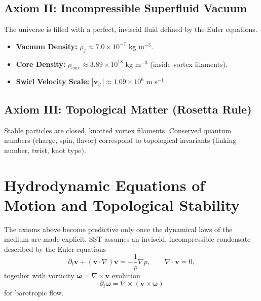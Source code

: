 \documentclass[10pt]{article}
\newcommand{\vswirl}{\mathbf{v}_{\!\boldsymbol{\circlearrowleft}}}
\newcommand{\rhof}{\rho_{\!f}}                           %
\newcommand{\rhocore}{\rho_{\text{core}}}
\begin{document}
        \subsection*{Axiom II: Incompressible Superfluid Vacuum}
            The universe is filled with a perfect, inviscid fluid defined by the Euler equations.
            \begin{itemize}
                \item \textbf{Vacuum Density:} $\rhof \approx 7.0 \times 10^{-7}$ kg m$^{-3}$.
                \item \textbf{Core Density:} $\rhocore \approx 3.89 \times 10^{18}$ kg m$^{-3}$ (inside vortex filaments).
                \item \textbf{Swirl Velocity Scale:} $|\vswirl| \approx 1.09 \times 10^6$ m s$^{-1}$.
            \end{itemize}

        \subsection*{Axiom III: Topological Matter (Rosetta Rule)}
            Stable particles are closed, knotted vortex filaments. Conserved quantum numbers (charge, spin, flavor) correspond to topological invariants (linking number, twist, knot type).

    \section{Hydrodynamic Equations of Motion and Topological Stability}
        \label{sec:hydroEOM}

        The axioms above become predictive only once the dynamical laws of the medium are
        made explicit. SST assumes an inviscid, incompressible condensate described by the
        Euler equations
        \begin{equation}
            \partial_t \mathbf{v} + (\mathbf{v}\cdot\nabla)\mathbf{v}
            = -\frac{1}{\rho}\nabla p,
            \qquad
            \nabla\cdot\mathbf{v}=0,
        \end{equation}
        together with vorticity $\boldsymbol{\omega}=\nabla\times\mathbf{v}$ evolution
        \begin{equation}
            \partial_t \boldsymbol{\omega} = \nabla\times(\mathbf{v}\times\boldsymbol{\omega})
        \end{equation}
        for barotropic flow.
\end{document}
